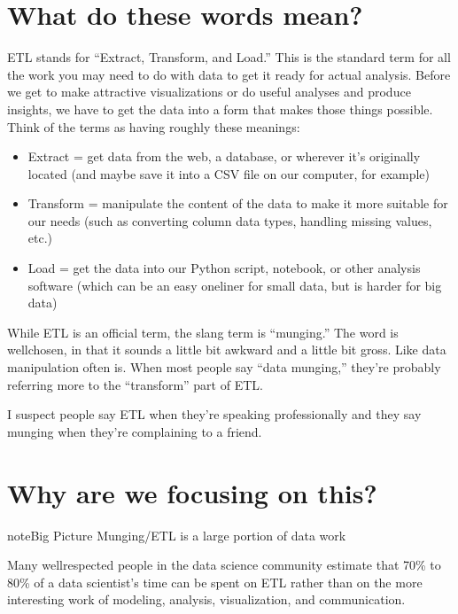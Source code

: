 \documentclass[letterpaper,10pt,english]{sphinxmanual}
\begin{document}
\section{What do these words mean?}
\label{\detokenize{chapter-13-etl:what-do-these-words-mean}}
ETL stands for “Extract, Transform, and Load.”  This is the standard term for all the work you may need to do with data to get it ready for actual analysis.  Before we get to make attractive visualizations or do useful analyses and produce insights, we have to get the data into a form that makes those things possible.  Think of the terms as having roughly these meanings:
\begin{itemize}
\item {} 
Extract = get data from the web, a database, or wherever it’s originally located (and maybe save it into a CSV file on our computer, for example)

\item {} 
Transform = manipulate the content of the data to make it more suitable for our needs (such as converting column data types, handling missing values, etc.)

\item {} 
Load = get the data into our Python script, notebook, or other analysis software (which can be an easy one\sphinxhyphen{}liner for small data, but is harder for big data)

\end{itemize}

While ETL is an official term, the slang term is “munging.”  The word is well\sphinxhyphen{}chosen, in that it sounds a little bit awkward and a little bit gross.  Like data manipulation often is.  When most people say “data munging,” they’re probably referring more to the “transform” part of ETL.

I suspect people say ETL when they’re speaking professionally and they say munging when they’re complaining to a friend.


\section{Why are we focusing on this?}
\label{\detokenize{chapter-13-etl:why-are-we-focusing-on-this}}
\begin{sphinxadmonition}{note}{Big Picture \sphinxhyphen{} Munging/ETL is a large portion of data work}

Many well\sphinxhyphen{}respected people in the data science community estimate that 70\% to 80\% of a data scientist’s time can be spent on ETL rather than on the more interesting work of modeling, analysis, visualization, and communication.
\end{sphinxadmonition}
\end{document}
